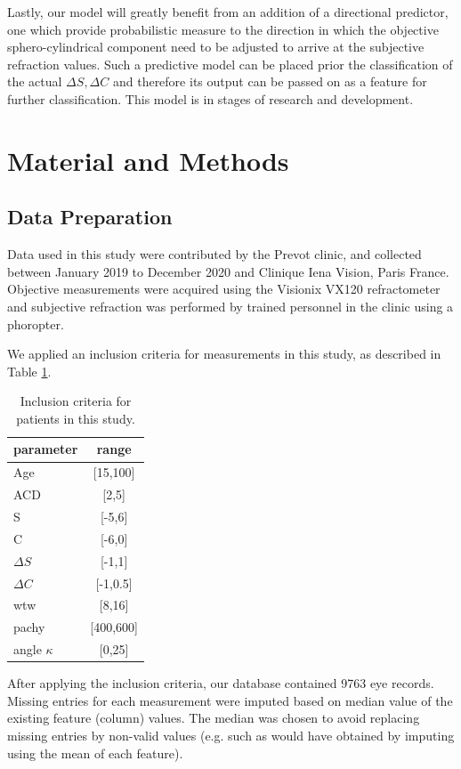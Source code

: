 \documentclass[article,twocolumn,preprint,10pt]{paper}%
\renewcommand{\(}{\left(}
\renewcommand{\)}{\right)}
\renewcommand{\[}{\left[}
\renewcommand{\]}{\right]}
\newcommand{\1}{\mbox{\boldmath$1$}}
\begin{document}
	Lastly, our model will greatly benefit from an addition of a directional predictor, one which provide probabilistic measure to the direction in which the objective sphero-cylindrical component need to be adjusted to arrive at the subjective refraction values. Such a predictive model can be placed prior the classification of the actual $\Delta S, \Delta C$ and therefore its output can be passed on as a feature for further classification. This model is in stages of research and development.
	
	\section{Material and Methods}\label{section:MaterialAndMethods}
	\subsection{Data Preparation}\label{subsection:DataPreparation}
	Data used in this study were contributed by the Prevot clinic, and collected between January 2019 to December 2020 and Clinique Iena Vision, Paris France. Objective measurements were acquired using the Visionix VX120 refractometer  and subjective refraction was performed by trained personnel in the clinic using a phoropter. 
	
	We applied an inclusion criteria for measurements in this study, as described in Table \ref{Table:inclusionCriteria}. 
	\begin{table}
	\begin{tabular}{l|c}
		parameter & range\\
		\hline 
       Age & [15,100]\\	
       ACD & [2,5]\\
       S      & [-5,6]\\
       C      & [-6,0]\\
       $\Delta S$ & [-1,1]\\
       $\Delta C$ & [-1,0.5]\\
       wtw & [8,16]\\
       pachy & [400,600]\\
       angle $\kappa$ & [0,25]
	\end{tabular}
     \caption{Inclusion criteria for patients in this study.}
     \label{Table:inclusionCriteria}
	\end{table}
   After applying the inclusion criteria, our database contained 9763 eye records.
   Missing entries for each measurement were imputed based on median value of the existing feature (column) values. The median was chosen to avoid replacing missing entries by non-valid values (e.g. such as would have obtained by imputing using the mean of each feature). 
   
\end{document}
